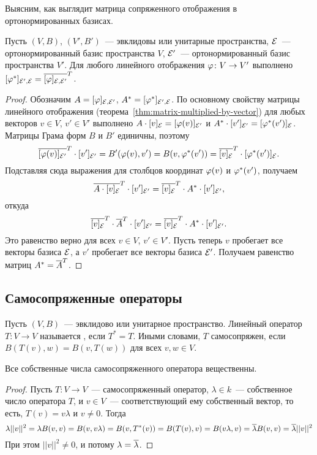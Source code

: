 Выясним, как выглядит матрица сопряженного отображения в
ортонормированных базисах.

\begin{proposition}\label{prop:adjoint_matrix}
Пусть $(V,B)$, $(V',B')$~--- эвклидовы или унитарные пространства,
$\mathcal E$~--- ортонормированный базис пространства $V$, $\mathcal E'$~---
ортонормированный базис пространства $V'$.
Для любого линейного отображения $\varphi\colon V\to V'$ выполнено
$[\varphi^*]_{\mathcal E',\mathcal E} = \overline{[\varphi]_{\mathcal E,\mathcal E'}}^T$.
\end{proposition}
\begin{proof}
Обозначим $A=[\varphi]_{\mathcal E,\mathcal E'}$, $A^*=[\varphi^*]_{\mathcal E',\mathcal E}$.
По основному свойству матрицы линейного отображения
(теорема~\ref{thm:matrix-multiplied-by-vector}) для любых векторов
$v\in V$, $v'\in V'$ выполнено 
$A\cdot [v]_{\mathcal E} = [\varphi(v)]_{\mathcal E'}$
и $A^*\cdot [v']_{\mathcal E'} = [\varphi^*(v')]_{\mathcal E}$.
Матрицы Грама форм $B$ и $B'$ единичны, поэтому
$$
\overline{[\varphi(v)]_{\mathcal E'}}^T\cdot [v']_{\mathcal E'} = B'(\varphi(v),v') =
B(v,\varphi^*(v')) =
\overline{[v]_{\mathcal E}}^T\cdot [\varphi^*(v')]_{\mathcal E}.
$$
Подставляя сюда выражения для столбцов координат $\varphi(v)$ и
$\varphi^*(v')$, получаем
$$
\overline{A\cdot[v]_{\mathcal E}}^T\cdot [v']_{\mathcal E'} = \overline{[v]_{\mathcal E}}^T\cdot
A^*\cdot [v']_{\mathcal E'},
$$
откуда
$$
\overline{[v]_{\mathcal E}}^T\cdot\overline{A}^T\cdot [v']_{\mathcal E'} = \overline{[v]_{\mathcal E}}^T\cdot
A^*\cdot [v']_{\mathcal E'}.
$$
Это равенство верно для всех $v\in V$, $v'\in V'$. Пусть теперь $v$
пробегает все векторы базиса $\mathcal E$, а $v'$ пробегает все векторы
базиса $\mathcal E'$. Получаем равенство матриц
$A^* = \overline{A}^T$.
\end{proof}

\subsection{Самосопряженные операторы}

\begin{definition}
Пусть $(V,B)$~--- эвклидово или унитарное пространство.
Линейный оператор $T\colon V\to V$ называется ,
если $T^* = T$. Иными словами, $T$ самосопряжен, если
$B(T(v),w) = B(v,T(w))$ для всех $v,w\in V$.
\end{definition}

\begin{proposition}
Все собственные числа самосопряженного оператора вещественны.
\end{proposition}
\begin{proof}
Пусть $T\colon V\to V$~--- самосопряженный оператор,
$\lambda\in k$~--- собственное число оператора $T$,
и $v\in V$~--- соответствующий ему собственный вектор,
то есть, $T(v) = v\lambda$ и $v\neq 0$.
Тогда
$$
\lambda ||v||^2 = \lambda B(v,v) = B(v,v\lambda)
= B(v,T^*(v)) = B(T(v),v) = B(v\lambda,v) = \overline\lambda B(v,v)
= \overline\lambda ||v||^2
$$
При этом $||v||^2\neq 0$, и потому $\lambda=\overline\lambda$.
\end{proof}

